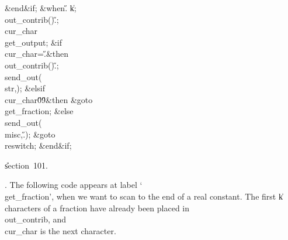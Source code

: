 \&{end}\8\2\&{if}\1;\6
\4\&{when}\8\H{.}\KR\6
\|k\?\K{};\5
\\{out\_contrib}\?\1(\?\2)\K\?\H{.};\5
\\{cur\_char}\?\K\?\\{get\_output};\6
\&{if}\1\1\8\\{cur\_char}\?=\?\H{.}\2\8\&{then}\6
\\{out\_contrib}\?\1(\?\2)\K\?\H{.};\5
\\{send\_out}\?\1(\?\\{str}\?,\?\2)\?;\6
\4\&{elsif}\1\8\\{cur\_char}\?\in\?\H{0}\?\to\?\H{9}\2\8\&{then}\6
\&{goto}\8\\{get\_fraction};\6
\4\&{else}\6
\\{send\_out}\?\1(\?\\{misc}\?,\?\H{.}\?\2)\?;\5
\&{goto}\8\\{reswitch};\2\6
\&{end}\8\2\&{if}\1;\par
\U section~101.\fi

. The following code appears at label `\\{get\_fraction}', when we want to
scan to the end of a real constant. The first \|k characters of a fraction
have already been placed in \\{out\_contrib}, and \\{cur\_char} is the next
character.

